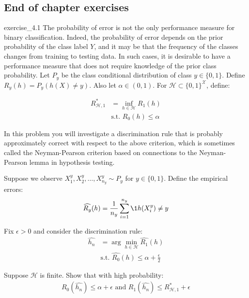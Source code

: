 \subsection{End of chapter exercises}
\begin{exercise}{}{exercise_4.1}
    The probability of error is not the only performance measure for binary classification. Indeed, the
    probability of error depends on the prior probability of the class label $Y$, and it may be that the
    frequency of the classes changes from training to testing data. In such cases, it is desirable to have a performance measure that does not require knowledge of the prior class probability. Let $P_y$ be the class conditional distribution of class $y\in\{0,1\}$. Define $R_y(h)=P_y(h(X) \ne y)$. Also let $\alpha \in (0,1)$. For $\mathcal{H}\subset\{0,1\}^{\mathcal{X}}$, define:

    \begin{align*}
        R^*_{\mathcal{H}, 1} &= \inf_{h\in\mathcal{H}} R_1(h) \\
        &\text{s.t. } R_0(h) \le \alpha 
    \end{align*}

    In this problem you will investigate a discrimination rule that is probably approximately correct with respect to the above criterion, which is sometimes called the Neyman-Pearson criterion based on connections to the Neyman-Pearson lemma in hypothesis testing.

    \noindent Suppose we observe $X_1^y, X_2^y, \dots, X_{n_y}^y \sim P_y$ for $y\in\{0,1\}$. Define the empirical errors:
    \begin{align*}
        \widehat{R_y}(h) = \frac{1}{n_y} \sum_{i=1}^{n_y} \1{h(X_i^y) \ne y}
    \end{align*}

    Fix $\epsilon > 0$ and consider the discrimination rule:
    \begin{align*}
        \widehat{h_n} &= \arg\min_{h\in\mathcal{H}} \widehat{R_1}(h) \\
        &\text{s.t. } \widehat{R_0}(h) \le \alpha + \frac{\epsilon}{2} 
    \end{align*}

    Suppose $\mathcal{H}$ is finite. Show that with high probability:
    \begin{align*}
        R_0(\widehat{h_n}) \le \alpha + \epsilon \text{ and } R_1(\widehat{h_n}) \le R^*_{\mathcal{H}, 1} + \epsilon
    \end{align*}
\end{exercise}

\begin{solution*}
    
\end{solution*}